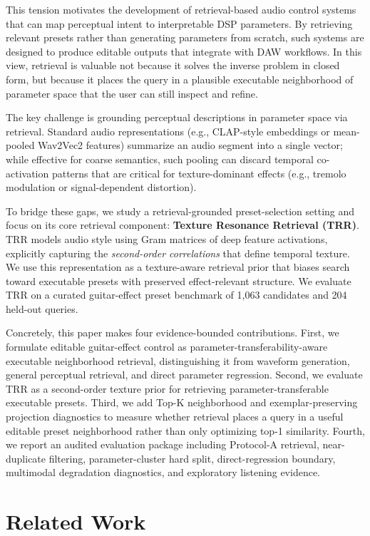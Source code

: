 This tension motivates the development of retrieval-based audio control systems that can map perceptual intent to interpretable DSP parameters. By retrieving relevant presets rather than generating parameters from scratch, such systems are designed to produce editable outputs that integrate with DAW workflows. In this view, retrieval is valuable not because it solves the inverse problem in closed form, but because it places the query in a plausible executable neighborhood of parameter space that the user can still inspect and refine.

The key challenge is grounding perceptual descriptions in parameter space via retrieval. Standard audio representations (e.g., CLAP-style embeddings or mean-pooled Wav2Vec2 features) summarize an audio segment into a single vector; while effective for coarse semantics, such pooling can discard temporal co-activation patterns that are critical for texture-dominant effects (e.g., tremolo modulation or signal-dependent distortion).

To bridge these gaps, we study a retrieval-grounded preset-selection setting and focus on its core retrieval component: \textbf{Texture Resonance Retrieval (TRR)}. TRR models audio style using Gram matrices of deep feature activations, explicitly capturing the \textit{second-order correlations} that define temporal texture. We use this representation as a texture-aware retrieval prior that biases search toward executable presets with preserved effect-relevant structure. We evaluate TRR on a curated guitar-effect preset benchmark of 1,063 candidates and 204 held-out queries.

Concretely, this paper makes four evidence-bounded contributions. First, we formulate editable guitar-effect control as parameter-transferability-aware executable neighborhood retrieval, distinguishing it from waveform generation, general perceptual retrieval, and direct parameter regression. Second, we evaluate TRR as a second-order texture prior for retrieving parameter-transferable executable presets. Third, we add Top-K neighborhood and exemplar-preserving projection diagnostics to measure whether retrieval places a query in a useful editable preset neighborhood rather than only optimizing top-1 similarity. Fourth, we report an audited evaluation package including Protocol-A retrieval, near-duplicate filtering, parameter-cluster hard split, direct-regression boundary, multimodal degradation diagnostics, and exploratory listening evidence.

\section{Related Work}
\label{sec:related_work}

